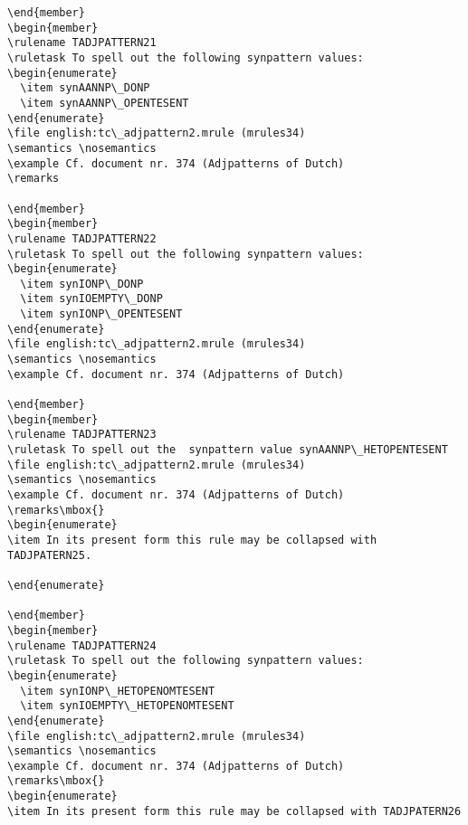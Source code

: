 \begin{verbatim}
\end{member}
\begin{member}
\rulename TADJPATTERN21
\ruletask To spell out the following synpattern values:
\begin{enumerate}
  \item synAANNP\_DONP
  \item synAANNP\_OPENTESENT 
\end{enumerate}
\file english:tc\_adjpattern2.mrule (mrules34)
\semantics \nosemantics
\example Cf. document nr. 374 (Adjpatterns of Dutch)
\remarks

\end{member}
\begin{member}
\rulename TADJPATTERN22
\ruletask To spell out the following synpattern values:
\begin{enumerate}
  \item synIONP\_DONP
  \item synIOEMPTY\_DONP 
  \item synIONP\_OPENTESENT
\end{enumerate}
\file english:tc\_adjpattern2.mrule (mrules34)
\semantics \nosemantics
\example Cf. document nr. 374 (Adjpatterns of Dutch)

\end{member}
\begin{member}
\rulename TADJPATTERN23
\ruletask To spell out the  synpattern value synAANNP\_HETOPENTESENT
\file english:tc\_adjpattern2.mrule (mrules34)
\semantics \nosemantics
\example Cf. document nr. 374 (Adjpatterns of Dutch)
\remarks\mbox{}
\begin{enumerate}
\item In its present form this rule may be collapsed with TADJPATERN25.

\end{enumerate}

\end{member}
\begin{member}
\rulename TADJPATTERN24
\ruletask To spell out the following synpattern values:
\begin{enumerate}
  \item synIONP\_HETOPENOMTESENT 
  \item synIOEMPTY\_HETOPENOMTESENT  
\end{enumerate}
\file english:tc\_adjpattern2.mrule (mrules34)
\semantics \nosemantics
\example Cf. document nr. 374 (Adjpatterns of Dutch)
\remarks\mbox{}
\begin{enumerate}
\item In its present form this rule may be collapsed with TADJPATERN26


\end{verbatim}
